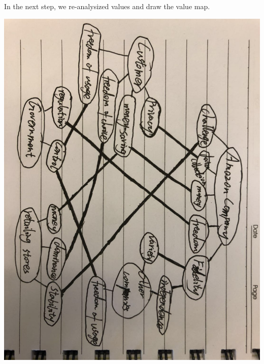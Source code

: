 \documentclass{article}
\begin{document}
In the next step, we re-analysized values and draw the value map.

\includegraphics[scale=0.3,angle=90]{iter_1.jpeg}
\end{document}
